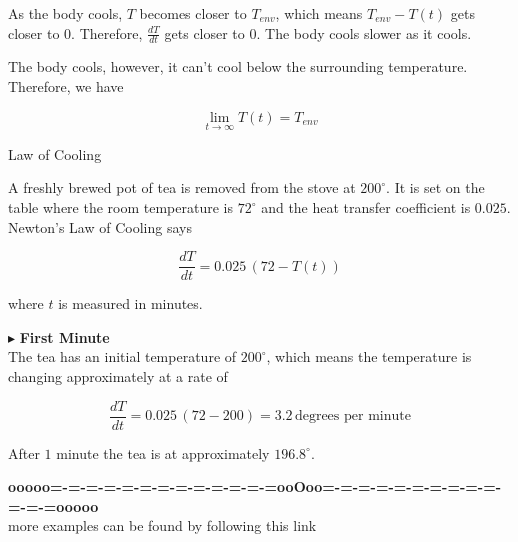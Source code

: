 \documentclass{ximera}
\begin{document}
\begin{observation}


As the body cools, $T$ becomes closer to $T_{env}$, which means  $T_{env} - T(t)$ gets closer to $0$.  Therefore, $\frac{dT}{dt}$ gets closer to $0$.  The body cools slower as it cools.
\end{observation}



\begin{observation}


The body cools, however, it can't cool below the surrounding temperature. Therefore, we have

\[
\lim\limits_{t \to \infty} T(t) = T_{env}
\]

\end{observation}








\begin{example} Law of Cooling 



A freshly brewed pot of tea is removed from the stove at $200^{\circ}$.  It is set on the table where the room temperature is $72^{\circ}$ and the heat transfer coefficient is $0.025$. \\


Newton's Law of Cooling says

\[
\frac{dT}{dt} = 0.025 \, (72 - T(t))
\]


where $t$ is measured in minutes.


$\blacktriangleright$ \textbf{First Minute} \\

The tea has an initial temperature of $200^{\circ}$, which means the temperature is changing approximately at a rate of 


\[
\frac{dT}{dt} = 0.025 \, (72 - 200) = 3.2 \, \text{degrees per minute}
\]


After $1$ minute the tea is at approximately $196.8^{\circ}$.




\end{example}




















\begin{center}
\textbf{\textcolor{green!50!black}{ooooo=-=-=-=-=-=-=-=-=-=-=-=-=ooOoo=-=-=-=-=-=-=-=-=-=-=-=-=ooooo}} \\

more examples can be found by following this link\\ 

\end{center}
\end{document}
